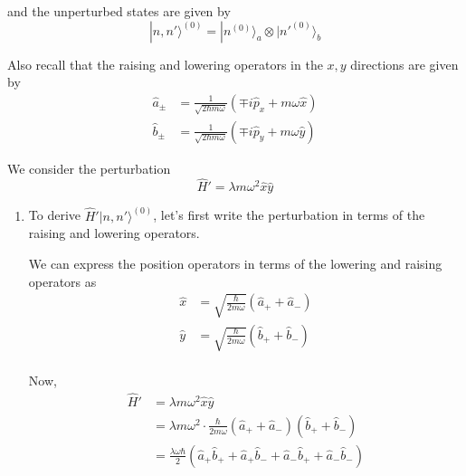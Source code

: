 \documentclass{article}
\newcommand{\ket}[1]{|#1 \rangle}
\begin{document}
and the unperturbed states are given by 
\[ \ket{n, n'}^{(0)} = \ket{n^{(0)}}_a \otimes \ket{n'^{(0)}}_b \]

Also recall that the raising and lowering operators in the $x, y$ directions are given by 
\begin{align*}
  \hat{a}_{\pm} &= \frac{1}{\sqrt{2\hbar m \omega}} \left( \mp i\hat{p}_x + m\omega \hat{x} \right) \\
  \hat{b}_{\pm} &= \frac{1}{\sqrt{2\hbar m \omega}} \left( \mp i\hat{p}_y + m\omega \hat{y} \right) 
\end{align*}

We consider the perturbation 
\[ \hat{H}' =  \lambda m \omega^2 \hat{x} \hat{y} \]

\vskip 0.5cm

\begin{enumerate}[label=(\alph*)]
  \item To derive $\hat{H}'\ket{n, n'}^{(0)}$, let's first write the perturbation in terms of the raising and lowering operators.

  We can express the position operators in terms of the lowering and raising operators as 
  \begin{align*}
    \hat{x} &= \sqrt{\frac{\hbar}{2m\omega}} \left( \hat{a}_+ + \hat{a}_- \right) \\
    \hat{y} &= \sqrt{\frac{\hbar}{2m\omega}} \left( \hat{b}_+ + \hat{b}_- \right) \\
  \end{align*}

  Now, 
  \begin{align*}
    \hat{H}' &=  \lambda m \omega^2 \hat{x} \hat{y} \\
    &= \lambda m \omega^2 \cdot \frac{\hbar}{2 m \omega} \left( \hat{a}_+ + \hat{a}_- \right)\left( \hat{b}_+ + \hat{b}_- \right) \\
    &= \frac{\lambda \omega \hbar}{2} \left( \hat{a}_{+} \hat{b}_{+} + \hat{a}_{+} \hat{b}_{-} + \hat{a}_{-} \hat{b}_{+} + \hat{a}_{-} \hat{b}_{-} \right)  
  \end{align*}


\end{enumerate}
\end{document}
